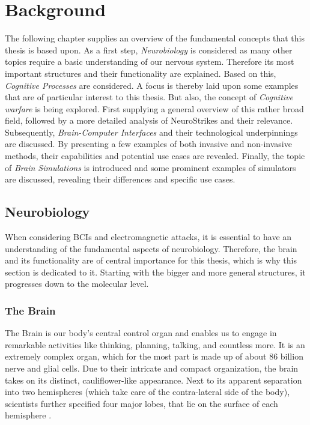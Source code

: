 \chapter{Background} %
\label{chap:background}
    The following chapter supplies an overview of the fundamental concepts that this thesis is based upon. As a first step, \textit{Neurobiology} is considered as many other topics require a basic understanding of our nervous system. Therefore its most important structures and their functionality are explained. Based on this, \textit{Cognitive Processes} are considered. A focus is thereby laid upon some examples that are of particular interest to this thesis.
    But also, the concept of \textit{Cognitive warfare} is being explored. First supplying a general overview of this rather broad field, followed by a more detailed analysis of NeuroStrikes and their relevance.
    Subsequently, \textit{Brain-Computer Interfaces} and their technological underpinnings are discussed. By presenting a few examples of both invasive and non-invasive methods, their capabilities and potential use cases are revealed.
    Finally, the topic of \textit{Brain Simulations} is introduced and some prominent examples of simulators are discussed, revealing their differences and specific use cases. 


\section{Neurobiology}
    When considering BCIs and electromagnetic attacks, it is essential to have an understanding of the fundamental aspects of neurobiology. Therefore, the brain and its functionality are of central importance for this thesis, which is why this section is dedicated to it. Starting with the bigger and more general structures, it progresses down to the molecular level.

\subsection{The Brain}
    The Brain is our body's central control organ and enables us to engage in remarkable activities like thinking, planning, talking, and countless more. It is an extremely complex organ, which for the most part is made up of about 86 billion nerve and glial cells. Due to their intricate and compact organization, the brain takes on its distinct, cauliflower-like appearance. Next to its apparent separation into two hemispheres (which take care of the contra-lateral side of the body), scientists further specified four major lobes, that lie on the surface of each hemisphere \cite{thebrain-SimpleToComplex-neuroAnatomy-b}.
    
